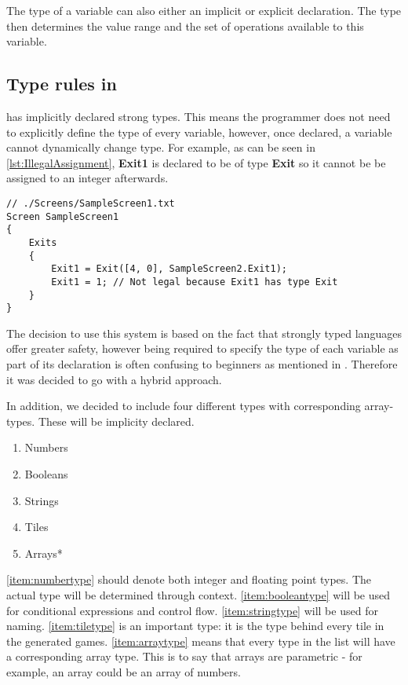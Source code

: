 The type of a variable can also either an implicit or explicit declaration.
The type then determines the value range and the set of operations available to this variable.

\subsection*{Type rules in \dazel{}}
\dazel{} has implicitly declared strong types.
This means the programmer does not need to explicitly define the type of every variable, however, once declared, a variable
cannot dynamically change type.
For example, as can be seen in \ref{lst:IllegalAssignment}, \textbf{Exit1} is declared to be of type \textbf{Exit} so it cannot be be
assigned to an integer afterwards.

\begin{lstlisting}[caption={Example of an illegal assingment}, label={lst:IllegalAssignment},escapechar=|]
// ./Screens/SampleScreen1.txt
Screen SampleScreen1 
{
    Exits 
    {
        Exit1 = Exit([4, 0], SampleScreen2.Exit1);
        Exit1 = 1; // Not legal because Exit1 has type Exit
    }
}
\end{lstlisting}

The decision to use this system is based on the fact that strongly typed languages offer greater safety, however being required to
specify the type of each variable as part of its declaration is often confusing to beginners as mentioned in .
Therefore it was decided to go with a hybrid approach.

In addition, we decided to include four different types with corresponding array-types. These will be implicity declared.

\begin{multicols}{3}
    \begin{enumerate}
        \item Numbers\label{item:numbertype}
        \item Booleans\label{item:booleantype}
        \item Strings\label{item:stringtype}
        \item Tiles\label{item:tiletype}
        \item Arrays*\label{item:arraytype}
    \end{enumerate}
\end{multicols}

\ref{item:numbertype} should denote both integer and floating point types. The actual type will be determined through context. \ref{item:booleantype} will be used for conditional expressions and control flow.
\ref{item:stringtype} will be used for naming.
\ref{item:tiletype} is an important type: it is the type behind every tile in the generated games.
\ref{item:arraytype} means that every type in the list will have a corresponding array type. This is to say that arrays are parametric - for example, an array could be an array of numbers.

